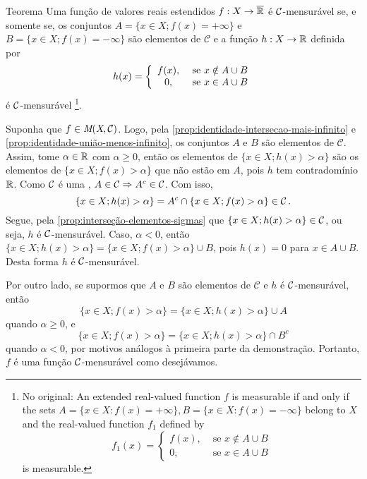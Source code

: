     \begin{env}{Teorema}
    \label{teo:condição-de-mensurabilidade}
        Uma função de valores reais estendidos $f: X \to \operatorname{\overline{\mathbb{R}}}$ é $\operatorname{\mathcal{C}}$-mensurável se, e somente se, os conjuntos 
        $A = \{ x \in X; f(x) = +\infty\}$ e $B = \{x \in X; f(x) = -\infty\}$
		 são elementos de $\mathcal{C}$ e a função $h: X \to \mathbb{R}$ definida por
		 \vspace{-0.2cm}
		 $$
		 h(x) = \left\{\begin{array}{cc}
		     f(x), & \textrm{\ se } x \notin A\cup B  \\
		      0,& \textrm{\ se } x \in A\cup B
		 \end{array}\right.
	 	 \vspace{-0.2cm}
		 $$
		 é $\operatorname{\mathcal{C}}$-mensurável \cite[p.11, tradução nossa, adaptação nossa]{bartle}
		 \footnote{No original: An extended real-valued function $f$ is measurable if and
		 	only if the sets
		 	$A = \{x \in X : f(x) = +\infty\}, B = \{x \in X : f(x) = -\infty\}$
		 	belong to $X$ and the real-valued function $f_1$ defined by
		 	$$f_1(x) = \left\{\begin{array}{cc}
		 		f(x), & \textrm{\ se } x \notin A\cup B  \\
		 		0,& \textrm{\ se } x \in A\cup B
		 	\end{array}\right.$$
		 is measurable.}.
		 \vspace{-0.2cm}
	 \end{env}
\begin{prova}
    Suponha que $f \in \operatorname{\textit{M}(\textit{X}, \mathcal{C} )}$. 
    Logo, pela \ref{prop:identidade-intersecao-mais-infinito} e \ref{prop:identidade-união-menos-infinito}, os conjuntos $A$ e $B$ são elementos de $\mathcal{C}$.
    Assim, tome $\alpha \in \mathbb{R}$ com $\alpha \geq 0$, então os elementos de $\{x \in X; h(x) > \alpha\}$ são os elementos de $\{x \in X; f(x) > \alpha\}$ que não estão em $A$, pois $h$ tem contradomínio $\mathbb{R}$.
    Como $\operatorname{\mathcal{C}}$ é uma \sigal\hspace{-0.1cm}, $A \in \operatorname{\mathcal{C}} \Rightarrow A^c \in \operatorname{\mathcal{C}}$. 
    Com isso, 
    \vspace{-0.2cm}
    $$
    \{x \in X; h(x) > \alpha\} = A^c\cap \{x \in X; f(x) > \alpha\} \in \cc.
    \vspace{-0.2cm}
    $$
    Segue, pela  \ref{prop:interseção-elementos-sigmas} que $\{x \in X; h(x) > \alpha\} \in \operatorname{\mathcal{C}}$, ou seja, $h$ é $\operatorname{\mathcal{C}}$-mensurável.
    Caso, $\alpha < 0$, então $\{x \in X; h(x) > \alpha\} = \{x \in  X ; f(x) > \alpha\} \cup B $, pois $h(x) = 0$ para $x \in A \cup B$.
    Desta forma $h$ é $\operatorname{\mathcal{C}}$-mensurável.

    Por outro lado, se supormos que $A$ e $B$ são elementos de $\mathcal{C}$ e $h$ é $\operatorname{\mathcal{C}}$-mensurável, então
    $$\{x \in X; f(x) > \alpha\} = \{x \in  X ; h(x) > \alpha\} \cup A $$
    quando $\alpha \geq 0$, e 
    $$\{x \in X; f(x) > \alpha\} = \{x \in  X ; h(x) > \alpha\} \cap B^c $$
    quando  $\alpha < 0$, por motivos análogos à primeira parte da demonstração.
    Portanto, $f$ é uma função $\operatorname{\mathcal{C}}$-mensurável como desejávamos.
\end{prova}

